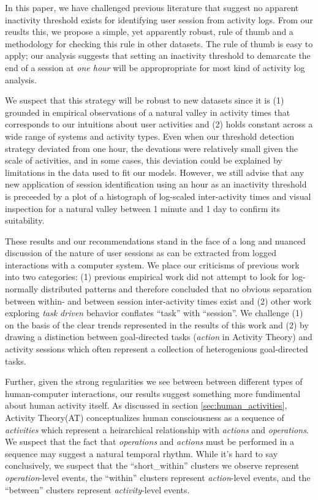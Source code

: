 In this paper, we have challenged previous literature that suggest no apparent inactivity threshold exists for identifying user session from activity logs.  From our reuslts this, we propose a simple, yet apparently robust, rule of thumb and a methodology for checking this rule in other datasets.  The rule of thumb is easy to apply; our analysis suggests that setting an inactivity threshold to demarcate the end of a session at \emph{one hour} will be appropropriate for most kind of activity log analysis.

We suspect that this strategy will be robust to new datasets since it is (1) grounded in empirical observations of a natural valley in activity times that corresponds to our intuitions about user activities and (2) holds constant across a wide range of systems and activity types. Even when our threshold detection strategy deviated from one hour, the devations were relatively small given the scale of activities, and in some cases, this deviation could be explained by limitations in the data used to fit our models.  However, we still advise that any new application of session identification using an hour as an inactivity threshold is preceeded by a plot of a histograph of log-scaled inter-activity times and visual inspection for a natural valley between 1 minute and 1 day to confirm its suitability.

These results and our recommendations stand in the face of a long and nuanced discussion of the nature of user sessions as can be extracted from logged interactions with a computer system.  We place our criticisms of previous work into two categories: (1) previous empirical work did not attempt to look for log-normally distributed patterns and therefore concluded that no obvious separation between within- and between session inter-activity times exist\cite{mehrzadi2012onextracting}\cite{catledge1995characterizing} and (2) other work exploring \emph{task driven} behavior conflates ``task'' with ``session''.  We challenge (1) on the basis of the clear trends represented in the results of this work and (2) by drawing a distinction between goal-directed tasks (\emph{action} in Activity Theory) and activity sessions which often represent a collection of heterogenious goal-directed tasks.

Further, given the strong regularities we see between between different types of human-computer interactions, our results suggest something more fundimental about human activity itself.  As discussed in section \ref{sec:human_activities}, Activity Theory(AT) conceptualizes human consciousness as a sequence of \emph{activities} which represent a heirarchical relationship with \emph{actions} and \emph{operations}.  We suspect that the fact that \emph{operations} and \emph{actions} must be performed in a sequence may suggest a natural temporal rhythm.  While it's hard to say conclusively, we suspect that the ``short\_within'' clusters we observe represent \emph{operation}-level events, the ``within'' clusters represent \emph{action}-level events, and the ``between'' clusters represent \emph{activity}-level events.

